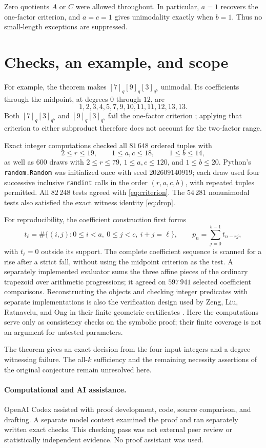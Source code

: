 \documentclass[11pt]{article}
\begin{document}
Zero quotients $A$ or $C$ were allowed throughout. In particular, $a=1$
recovers the one-factor criterion, and $a=c=1$ gives unimodality exactly
when $b=1$. Thus no small-length exceptions are suppressed.

\section{Checks, an example, and scope}
For example, the theorem makes $[7]_q[9]_q[3]_{q^5}$ unimodal.
Its coefficients through the midpoint, at degrees $0$ through $12$, are
\[
 1,2,3,4,5,7,9,10,11,11,12,13,13.
\]
Both $[7]_q[3]_{q^5}$ and $[9]_q[3]_{q^5}$ fail the one-factor criterion
\cite[Proposition~5.3]{CIMSY2026}; applying that criterion to either
subproduct therefore does not account for the two-factor range.

Exact integer computations checked all $81\,648$ ordered tuples with
\[
 2\le r\le19,\qquad 1\le a,c\le18,\qquad 1\le b\le14,
\]
as well as $600$ draws with $2\le r\le79$, $1\le a,c\le120$, and
$1\le b\le20$. Python's \texttt{random.Random} was initialized once with seed
$202609140919$; each draw used four successive inclusive \texttt{randint}
calls in the order $(r,a,c,b)$, with repeated tuples permitted.
All $82\,248$ tests agreed with \eqref{eq:criterion}. The $54\,281$
nonunimodal tests also satisfied the exact witness identity
\eqref{eq:drop}.

For reproducibility, the coefficient construction first forms
\[
 t_\ell=\#\{(i,j):0\le i<a,\ 0\le j<c,\ i+j=\ell\},
 \qquad p_n=\sum_{j=0}^{b-1}t_{n-rj},
\]
with $t_\ell=0$ outside its support. The complete coefficient sequence is
scanned for a rise after a strict fall, without using the midpoint
criterion as the test. A separately implemented evaluator sums the three
affine pieces of the ordinary trapezoid over arithmetic progressions;
it agreed on $597\,941$ selected coefficient comparisons.
Reconstructing the objects and checking integer predicates with separate
implementations is also the verification design used by Zeng, Liu,
Ratnavelu, and Ong in their finite geometric certificates
\cite[Sections~4 and~6]{ZengEtAl2026}. Here the computations serve only as
consistency checks on the symbolic proof; their finite coverage is not
an argument for untested parameters.

The theorem gives an exact decision from the four input integers and a
degree witnessing failure. The all-$k$ sufficiency and the remaining
necessity assertions of the original conjecture remain unresolved here.

\paragraph{Computational and AI assistance.}
OpenAI Codex assisted with proof development, code, source comparison, and
drafting. A separate model context examined the proof and ran separately
written exact checks. This checking pass was not external peer review or
statistically independent evidence. No proof assistant was used.


\small

\normalsize
\end{document}
